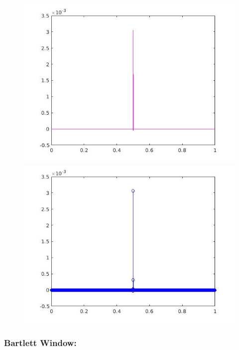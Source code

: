 \documentclass[a4paper,11pt]{article}
\begin{document}
\begin{figure}[!hp]
\centering
\begin{minipage}{.5\textwidth}
  \centering
  \includegraphics[width=1\linewidth]{images/lab2_31.jpg}
\end{minipage}%
\begin{minipage}{.5\textwidth}
  \centering
  \includegraphics[width=1\linewidth]{images/lab2_32.jpg}
\end{minipage}
\end{figure}

\newpage

\subsubsection{Bartlett Window:}
\end{document}
